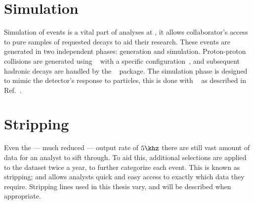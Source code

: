 \section{Simulation}
Simulation of events is a vital part of analyses at \lhcb, it allows collaborator's access to pure
samples of requested decays to aid their research.
These events are generated in two independent phases: generation and simulation.
Proton-proton collisions are generated using \pythia~\cite{Sjostrand:2006za,*Sjostrand:2007gs}
with a specific \lhcb configuration~\cite{LHCb-PROC-2010-056},
and subsequent hadronic decays are handled by the \evtgen~\cite{Lange:2001uf} package.
The simulation phase is designed to mimic the \lhcb detector's response to particles, this is done
with \geant~\cite{Allison:2006ve, *Agostinelli:2002hh} as described in
Ref.~\cite{LHCb-PROC-2011-006}.


\section{Stripping}
Even the --- much reduced --- output rate of $5\khz$ there are still vast amount of data for an
analyst to sift through.
To aid this, additional selections are applied to the dataset twice a year, to further categorize
each event.
This is known as stripping; and allows analysts quick and easy access to exactly which data they
require.
Stripping lines used in this thesis vary, and will be described when appropriate.










